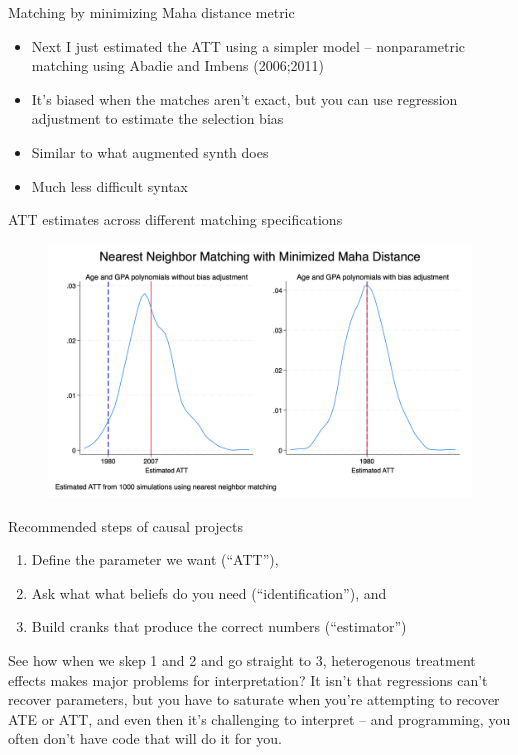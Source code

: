 \documentclass{beamer}
\begin{document}
\begin{frame}{Matching by minimizing Maha distance metric}

\begin{itemize}
\item Next I just estimated the ATT using a simpler model -- nonparametric matching using Abadie and Imbens (2006;2011)
\item It's biased when the matches aren't exact, but you can use regression adjustment to estimate the selection bias
\item Similar to what augmented synth does 
\item Much less difficult syntax
\end{itemize}

\end{frame}

\begin{frame}{ATT estimates across different matching specifications}

\begin{figure}
\begin{center}
             \includegraphics[scale=0.1]{./lecture_includes/combined_kernels_maha.jpg}
\end{center}
\end{figure}

\end{frame}


\begin{frame}{Recommended steps of causal projects}

\begin{enumerate}
\item Define the parameter we want (``ATT''), 
\item Ask what what beliefs do you need (``identification''), and 
\item Build cranks that produce the correct numbers (``estimator'')
\end{enumerate}

\bigskip

See how when we skep 1 and 2 and go straight to 3, heterogenous treatment effects makes major problems for interpretation?  It isn't that regressions can't recover parameters, but you have to saturate when you're attempting to recover ATE or ATT, and even then it's challenging to interpret -- and programming, you often don't have code that will do it for you.

\end{frame}
\end{document}
